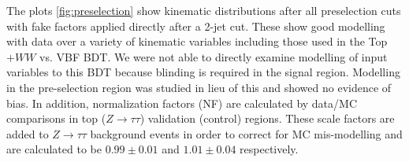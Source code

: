 The plots \ref{fig:preselection} show kinematic distributions after all preselection cuts with fake factors applied directly after a 2-jet cut. These show good modelling with data over a variety of kinematic variables including those used in the Top$+WW$ vs. VBF BDT. We were not able to directly examine modelling of input variables to this BDT because blinding is required in the signal region. Modelling in the pre-selection region was studied in lieu of this and showed no evidence of bias. In addition, normalization factors (NF) are calculated by data/MC comparisons in top ($Z\rightarrow\tau\tau$) validation (control) regions. These scale factors are added to $Z\rightarrow\tau\tau$ background events in order to correct for MC mis-modelling and are calculated to be $0.99\pm0.01$ and $1.01\pm0.04$ respectively. 

\begin{figure}[!h]
  \hfill
  \hfill
  \hfill
\end{figure}
